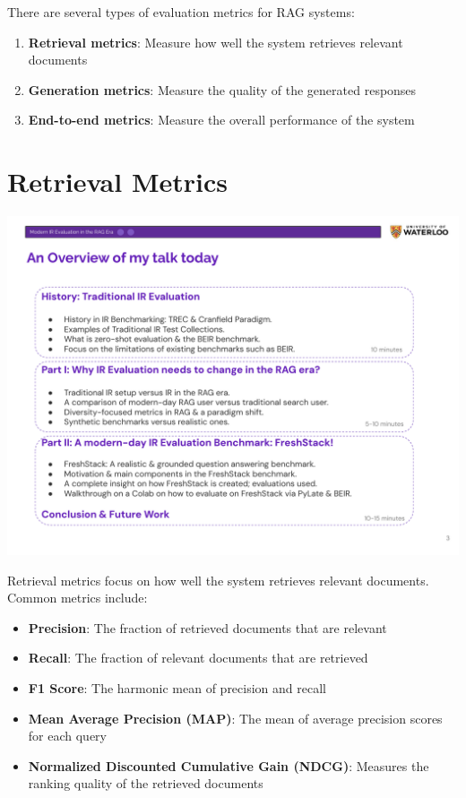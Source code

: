 \documentclass[
  letterpaper,
  oneside]{scrbook}
\providecommand{\tightlist}{%
  \setlength{\itemsep}{0pt}\setlength{\parskip}{0pt}}\usepackage{longtable,booktabs,array}
\begin{document}
There are several types of evaluation metrics for RAG systems:

\begin{enumerate}
\def\labelenumi{\arabic{enumi}.}
\tightlist
\item
  \textbf{Retrieval metrics}: Measure how well the system retrieves
  relevant documents
\item
  \textbf{Generation metrics}: Measure the quality of the generated
  responses
\item
  \textbf{End-to-end metrics}: Measure the overall performance of the
  system
\end{enumerate}

\section{Retrieval Metrics}\label{retrieval-metrics}

\includegraphics{chapters/../p2-images/slide_3.png}

Retrieval metrics focus on how well the system retrieves relevant
documents. Common metrics include:

\begin{itemize}
\tightlist
\item
  \textbf{Precision}: The fraction of retrieved documents that are
  relevant
\item
  \textbf{Recall}: The fraction of relevant documents that are retrieved
\item
  \textbf{F1 Score}: The harmonic mean of precision and recall
\item
  \textbf{Mean Average Precision (MAP)}: The mean of average precision
  scores for each query
\item
  \textbf{Normalized Discounted Cumulative Gain (NDCG)}: Measures the
  ranking quality of the retrieved documents
\end{itemize}
\end{document}
